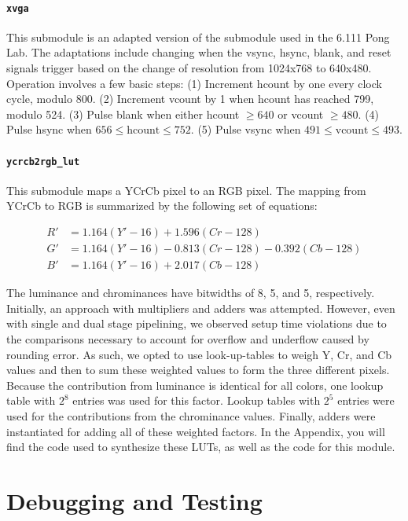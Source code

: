 \documentclass[10pt]{article}
\begin{document}
\paragraph{{\tt xvga}}
This submodule is an adapted version of the submodule used in the 6.111 Pong Lab. The adaptations include changing when the vsync, hsync, blank, and reset signals trigger based on the change of resolution from 1024x768 to 640x480. Operation involves a few basic steps\cite{xvga}: (1) Increment hcount by one every clock cycle, modulo 800. (2) Increment vcount by 1 when hcount has reached 799, modulo 524. (3) Pulse blank when either hcount $\geq 640$ or vcount $\geq 480$. (4) Pulse hsync when $656 \leq \text{hcount} \leq 752$. (5) Pulse vsync when $491 \leq \text{vcount} \leq 493$.

\paragraph{{\tt ycrcb2rgb\_lut}}
This submodule maps a YCrCb pixel to an RGB pixel. The mapping from YCrCb to RGB is summarized by the following set of equations\cite{ycrcb}:

\begin{align*}
R' & = 1.164(Y'-16) + 1.596(Cr-128) \\
G' & = 1.164(Y'-16) - 0.813(Cr-128) - 0.392(Cb-128) \\
B' & = 1.164(Y'-16) + 2.017(Cb-128)
\end{align*}

The luminance and chrominances have bitwidths of 8, 5, and 5, respectively. Initially, an approach with multipliers and adders was attempted. However, even with single and dual stage pipelining, we observed setup time violations due to the comparisons necessary to account for overflow and underflow caused by rounding error. As such, we opted to use look-up-tables to weigh Y, Cr, and Cb values and then to sum these weighted values to form the three different pixels. Because the contribution from luminance is identical for all colors, one lookup table with \( 2^8 \) entries was used for this factor. Lookup tables with \( 2^5 \) entries were used for the contributions from the chrominance values. Finally, adders were instantiated for adding all of these weighted factors. In the Appendix, you will find the code used to synthesize these LUTs, as well as the code for this module.

\section{Debugging and Testing}
\end{document}
